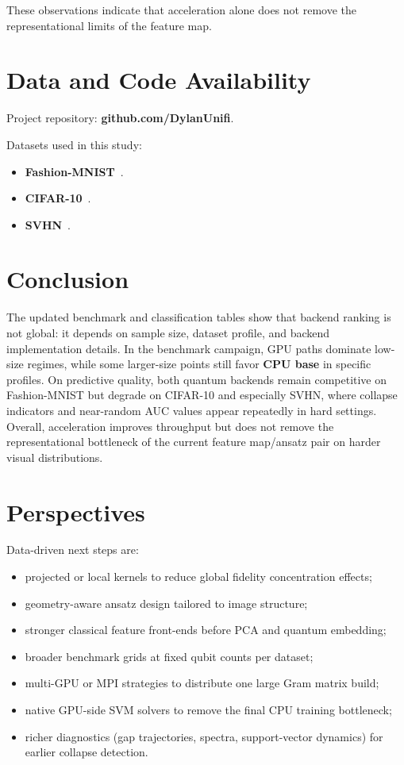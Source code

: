 \documentclass[10pt,twocolumn,letterpaper]{article}
\begin{document}
These observations indicate that acceleration alone does not remove the representational limits of the feature map.

\section{Data and Code Availability}
Project repository: \textbf{github.com/DylanUnifi}.

Datasets used in this study:
\begin{itemize}
    \item \textbf{Fashion-MNIST}~\cite{xiao2017fashion}.
    \item \textbf{CIFAR-10}~\cite{krizhevsky2009cifar}.
    \item \textbf{SVHN}~\cite{netzer2011svhn}.
\end{itemize}


\section{Conclusion}
The updated benchmark and classification tables show that backend ranking is not global: it depends on sample size, 
dataset profile, and backend implementation details.  In the benchmark campaign, GPU paths dominate low-size regimes, 
while some larger-size points still favor \textbf{CPU base} in specific profiles. On predictive quality, both quantum 
backends remain competitive on Fashion-MNIST but degrade on CIFAR-10 and especially SVHN, where collapse indicators 
and near-random AUC values appear repeatedly in hard settings. Overall, acceleration improves throughput but does not 
remove the representational bottleneck of the current feature map/ansatz pair on harder visual distributions.

\section{Perspectives}
Data-driven next steps are:
\begin{itemize}
    \item projected or local kernels to reduce global fidelity concentration effects;
    \item geometry-aware ansatz design tailored to image structure;
    \item stronger classical feature front-ends before PCA and quantum embedding;
    \item broader benchmark grids at fixed qubit counts per dataset;
    \item multi-GPU or MPI strategies to distribute one large Gram matrix build;
    \item native GPU-side SVM solvers to remove the final CPU training bottleneck;
    \item richer diagnostics (gap trajectories, spectra, support-vector dynamics) for earlier collapse detection.
\end{itemize}

{\small


}
\end{document}
